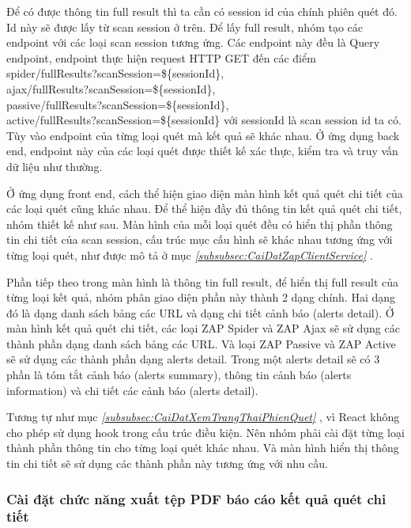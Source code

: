 Để có được thông tin full result thì ta cần có session id của chính phiên quét đó.
Id này sẽ được lấy từ scan session ở trên.
Để lấy full result, nhóm tạo các endpoint với các loại scan session tương ứng.
Các endpoint này đều là Query endpoint, endpoint thực hiện request HTTP GET đến các điểm \\
spider/fullResults?scanSession=\$\{sessionId\},\\
ajax/fullResults?scanSession=\$\{sessionId\},\\
passive/fullResults?scanSession=\$\{sessionId\},\\
active/fullResults?scanSession=\$\{sessionId\} với sessionId là scan session id ta có.
Tùy vào endpoint của từng loại quét mà kết quả sẽ khác nhau.
Ở ứng dụng back end, endpoint này của các loại quét được thiết kế xác thực, kiểm tra và truy vấn dữ liệu như thường.

Ở ứng dụng front end, cách thể hiện giao diện màn hình kết quả quét chi tiết của các loại quét cũng khác nhau.
Để thể hiện đầy đủ thông tin kết quả quét chi tiết, nhóm thiết kế như sau.
Màn hình của mỗi loại quét đều có hiển thị phần thông tin chi tiết của scan session, cấu trúc mục cấu hình sẽ khác nhau tương ứng với từng loại quét, như được mô tả ở mục \textit{\ref{subsubsec:CaiDatZapClientService} }.

Phần tiếp theo trong màn hình là thông tin full result, để hiển thị full result của từng loại kết quả, nhóm phân giao diện phần này thành 2 dạng chính.
Hai dạng đó là dạng danh sách bảng các URL và dạng chi tiết cảnh báo (alerts detail).
Ở màn hình kết quả quét chi tiết, các loại ZAP Spider và ZAP Ajax sẽ sử dụng các thành phần dạng danh sách bảng các URL.
Và loại ZAP Passive và ZAP Active sẽ sử dụng các thành phần dạng alerts detail.
Trong một alerts detail sẽ có 3 phần là tóm tắt cảnh báo (alerts summary), thông tin cảnh báo (alerts information) và chi tiết các cảnh báo (alerts detail).

Tương tự như mục \textit{\ref{subsubsec:CaiDatXemTrangThaiPhienQuet} }, vì React không cho phép sử dụng hook trong cấu trúc điều kiện. Nên nhóm phải cài đặt từng loại thành phần thông tin cho từng loại quét khác nhau. Và màn hình hiển thị thông tin chi tiết sẽ sử dụng các thành phần này tương ứng với nhu cầu.

\subsubsection{Cài đặt chức năng xuất tệp PDF báo cáo kết quả quét chi tiết} \label{subsubsec:CaiDatChucNangXuatTepPDF}

